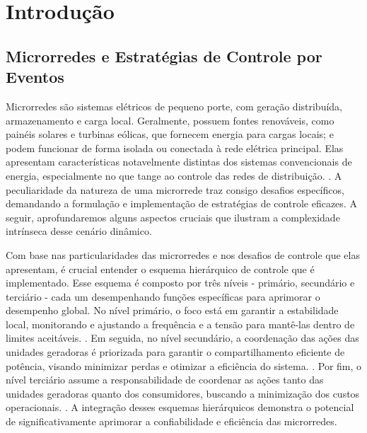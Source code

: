 

\chapter{Introdução}

\section{Microrredes e Estratégias de Controle por Eventos}

Microrredes são sistemas elétricos de pequeno porte, com geração distribuída, armazenamento e carga local. Geralmente, possuem fontes renováveis, como painéis solares e turbinas eólicas, que fornecem energia para cargas locais; e podem funcionar de forma isolada ou conectada à rede elétrica principal. Elas apresentam características notavelmente distintas dos sistemas convencionais de energia, especialmente no que tange ao controle das redes de distribuição. \cite{Paigi2013}. A peculiaridade da natureza de uma microrrede traz consigo desafios específicos, demandando a formulação e implementação de estratégias de controle eficazes. A seguir, aprofundaremos alguns aspectos cruciais que ilustram a complexidade intrínseca desse cenário dinâmico.

Com base nas particularidades das microrredes e nos desafios de controle que elas apresentam, é crucial entender o esquema hierárquico de controle que é implementado. Esse esquema é composto por três níveis - primário, secundário e terciário - cada um desempenhando funções específicas para aprimorar o desempenho global. No nível primário, o foco está em garantir a estabilidade local, monitorando e ajustando a frequência e a tensão para mantê-las dentro de limites aceitáveis. \cite{Paigi2013}. Em seguida, no nível secundário, a coordenação das ações das unidades geradoras é priorizada para garantir o compartilhamento eficiente de potência, visando minimizar perdas e otimizar a eficiência do sistema. \cite{Paigi2013}. Por fim, o nível terciário assume a responsabilidade de coordenar as ações tanto das unidades geradoras quanto dos consumidores, buscando a minimização dos custos operacionais. \cite{Paigi2013}. A integração desses esquemas hierárquicos demonstra o potencial de significativamente aprimorar a confiabilidade e eficiência das microrredes.

